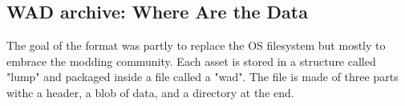 \par
\begin{figure}[H]
\centering
{}
\end{figure}



\subsection{WAD archive: Where Are the Data}
\label{wad_explained}
The goal of the  format was partly to replace the OS filesystem but mostly to embrace the modding community. Each asset is stored in a structure called "lump" and packaged inside a file called a "wad". The file is made of three parts withc a header, a blob of data, and a directory at the end.\\

